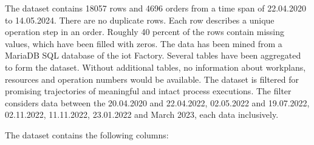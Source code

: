The dataset contains 18057 rows and 4696 orders from a time span of 22.04.2020 to 14.05.2024. There are no duplicate rows. Each row describes a unique operation step in an order. Roughly 40 percent of the rows contain missing values, which have been filled with zeros. The data has been mined from a MariaDB SQL database of the \gls{iot} Factory. Several tables have been aggregated to form the dataset. Without additional tables, no information about workplans, resources and operation numbers would be available. The dataset is filtered for promising trajectories of meaningful and intact process executions. The filter considers data between the 20.04.2020 and 22.04.2022, 02.05.2022 and 19.07.2022, 02.11.2022, 11.11.2022, 23.01.2022 and March 2023, each data inclusively.

The dataset contains the following columns:

